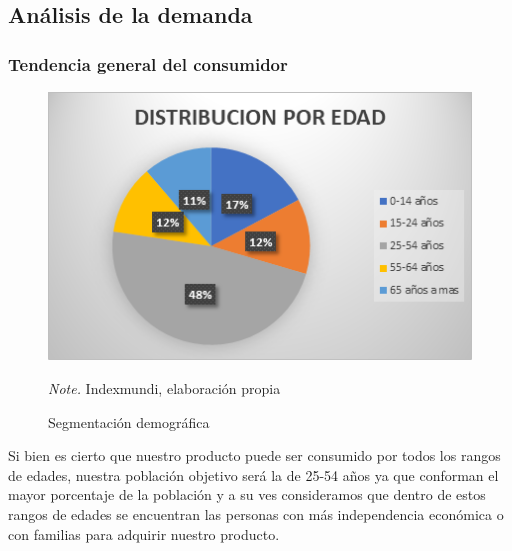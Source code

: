 \documentclass[
  stu,
  floatsintext,
  longtable,
  a4paper,
  nolmodern,
  notxfonts,
  notimes,
  colorlinks=true,linkcolor=blue,citecolor=blue,urlcolor=blue]{apa7}
\begin{document}
\subsection{Análisis de la demanda}\label{anuxe1lisis-de-la-demanda}

\subsubsection{Tendencia general del
consumidor}\label{tendencia-general-del-consumidor}

\begin{figure}[!htbp]

{\caption{{Segmentación demográfica}{\label{fig-myimportedimagesd}}}}

\includegraphics[width=5in,height=\textheight,keepaspectratio]{index_files/figure-html/figura9.png}

{\noindent \emph{Note.} Indexmundi, elaboración propia}

\end{figure}

Si bien es cierto que nuestro producto puede ser consumido por todos los
rangos de edades, nuestra población objetivo será la de 25-54 años ya
que conforman el mayor porcentaje de la población y a su ves
consideramos que dentro de estos rangos de edades se encuentran las
personas con más independencia económica o con familias para adquirir
nuestro producto.
\end{document}
